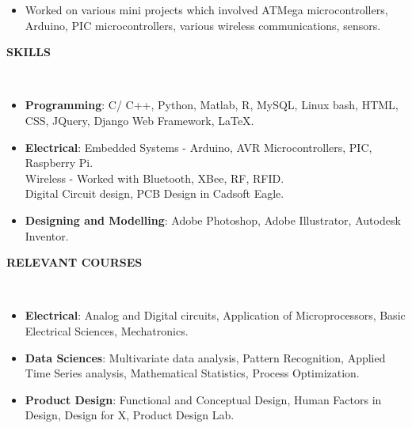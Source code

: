 \documentclass[a4paper,10pt]{article}
\newcommand{\lsep}{-0.5cm}
\newcommand{\resheading}[1]{{\small \colorbox{mygrey}{\begin{minipage}{0.975\textwidth}{\textbf{#1 \vphantom{p\^{E}}}}\end{minipage}}}}
\begin{document}
\begin{itemize}
        \item Worked on various mini projects which involved ATMega microcontrollers, Arduino, PIC microcontrollers, various wireless communications, sensors.

    \end{itemize}


\resheading{\textbf{SKILLS} }\\[\lsep]
    \begin{itemize}
        \item \textbf{Programming}: C/ C++, Python, Matlab, R, MySQL, Linux bash, HTML, CSS, JQuery, Django Web Framework, \LaTeX.
        \item \textbf{Electrical}: Embedded Systems - Arduino,  AVR Microcontrollers, PIC,  Raspberry Pi.\\
        Wireless - Worked with Bluetooth, XBee, RF, RFID.\\
        Digital Circuit design, PCB Design in Cadsoft Eagle.
        \item \textbf{Designing and Modelling}: Adobe Photoshop, Adobe Illustrator, Autodesk Inventor.
    \end{itemize}
\newpage
\resheading{\textbf{RELEVANT COURSES} }\\[\lsep]
\begin{itemize}
    \item  \textbf{Electrical}: Analog and Digital circuits, Application of Microprocessors, Basic Electrical Sciences, Mechatronics.
    \item \textbf{Data Sciences}: Multivariate data analysis, Pattern Recognition, Applied Time Series analysis, Mathematical Statistics, Process Optimization.
    \item \textbf{Product Design}: Functional and Conceptual Design, Human Factors in Design, Design for X, Product Design Lab.
\end{itemize}
\end{document}
